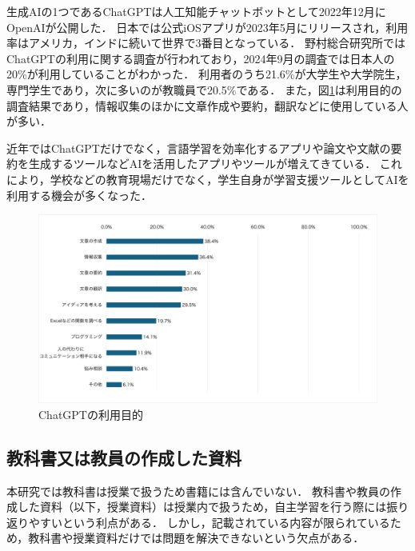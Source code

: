 \documentclass[12pt,a4j,titlepage]{ltjsarticle}
\begin{document}
生成AIの1つであるChatGPTは人工知能チャットボットとして2022年12月にOpenAIが公開した．
日本では公式iOSアプリが2023年5月にリリースされ，利用率はアメリカ，インドに続いて世界で3番目となっている．
野村総合研究所ではChatGPTの利用に関する調査が行われており，2024年9月の調査では日本人の20\%が利用していることがわかった．
利用者のうち21.6\%が大学生や大学院生，専門学生であり，次に多いのが教職員で20.5\%である．
また，図\ref{fig:chat}は利用目的の調査結果であり，情報収集のほかに文章作成や要約，翻訳などに使用している人が多い\cite{nomura2023}．

近年ではChatGPTだけでなく，言語学習を効率化するアプリや論文や文献の要約を生成するツールなどAIを活用したアプリやツールが増えてきている．
これにより，学校などの教育現場だけでなく，学生自身が学習支援ツールとしてAIを利用する機会が多くなった．

\begin{figure}[!htb]
  \centering
  \includegraphics[width=17cm]{利用目的.pdf}
  \caption{ChatGPTの利用目的}
  \label{fig:chat}
\end{figure}

\clearpage


\subsection{教科書又は教員の作成した資料}
本研究では教科書は授業で扱うため書籍には含んでいない．
教科書や教員の作成した資料（以下，授業資料）は授業内で扱うため，自主学習を行う際には振り返りやすいという利点がある．
しかし，記載されている内容が限られているため，教科書や授業資料だけでは問題を解決できないという欠点がある．
\end{document}
